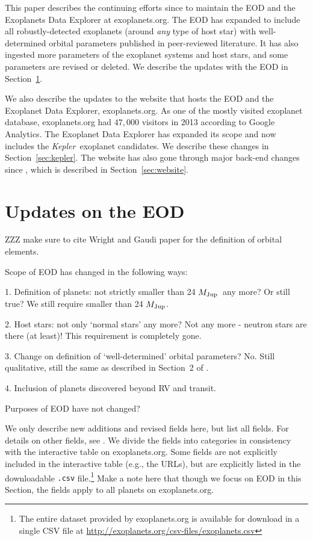 \documentclass[11pt,preprint]{aastex}
\def\kepler{\textit{Kepler}}
\def\mjup{$M_{\rm Jup}$}
\begin{document}
\begin{CJK*}{UTF8}{gbsn}
This paper describes the continuing efforts since \cite{Wright2011} to
maintain the EOD and the Exoplanets Data Explorer at
exoplanets.org. The EOD has expanded to include all robustly-detected
exoplanets (around {\it any} type of host star) with well-determined
orbital parameters published in peer-reviewed literature. It has also
ingested more parameters of the exoplanet systems and host stars, and
some parameters are revised or deleted. We describe the updates with
the EOD in Section~\ref{sec:update}.

We also describe the updates to the website that hosts the EOD and the
Exoplanet Data Explorer, exoplanets.org. As one of the mostly visited
exoplanet database, exoplanets.org had $47,000$ visitors in 2013
according to Google Analytics. The Exoplanet Data Explorer has
expanded its scope and now includes the \kepler\ exoplanet
candidates. We describe these changes in Section~\ref{sec:kepler}. The
website has also gone through major back-end changes since
\cite{Wright2011}, which is described in Section~\ref{sec:website}.



\section{Updates on the EOD}\label{sec:update}
ZZZ make sure to cite Wright and Gaudi paper for the definition of orbital elements. 

Scope of EOD has changed in the following ways:

1. Definition of planets: not strictly smaller than 24 \mjup\ any
more? Or still true? We still require smaller than 24 \mjup.

2. Host stars: not only `normal stars' any more? Not any more -
neutron stars are there (at least)! This requirement is completely gone.

3. Change on definition of `well-determined' orbital parameters? No. Still
qualitative, still the same as described in Section~2 of \cite{Wright2011}.

4. Inclusion of planets discovered beyond RV and transit.

Purposes of EOD have not changed?

We only describe new additions and revised fields here, but list all
fields. For details on other fields, see \cite{Wright2011}. We divide
the fields into categories in consistency with the interactive table
on exoplanets.org. Some fields are not explicitly included in the
interactive table (e.g., the URLs), but are explicitly listed in the
downloadable {\tt .csv} file.\footnote{The entire dataset provided by
  exoplanets.org is available for download in a single CSV file at
  \url{http://exoplanets.org/csv-files/exoplanets.csv}} Make a note
here that though we focus on EOD in this Section, the fields apply to
all planets on exoplanets.org.


\end{CJK*}
\end{document}
